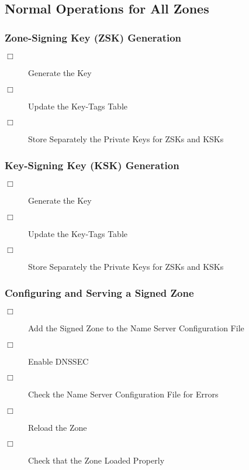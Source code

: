 

\subsection{Normal Operations for All Zones}


\subsubsection{Zone-Signing Key (ZSK) Generation}

\begin{description}
\item [$\Box$] Generate the Key
\item [$\Box$] Update the Key-Tags Table
\item [$\Box$] Store Separately the Private Keys for ZSKs and KSKs
\end{description}


\subsubsection{Key-Signing Key (KSK) Generation}

\begin{description}
\item [$\Box$] Generate the Key
\item [$\Box$] Update the Key-Tags Table
\item [$\Box$] Store Separately the Private Keys for ZSKs and KSKs
\end{description}


\subsubsection{Configuring and Serving a Signed Zone}

\begin{description}
\item [$\Box$] Add the Signed Zone to the Name Server Configuration File
\item [$\Box$] Enable DNSSEC
\item [$\Box$] Check the Name Server Configuration File for Errors
\item [$\Box$] Reload the Zone
\item [$\Box$] Check that the Zone Loaded Properly
\end{description}

